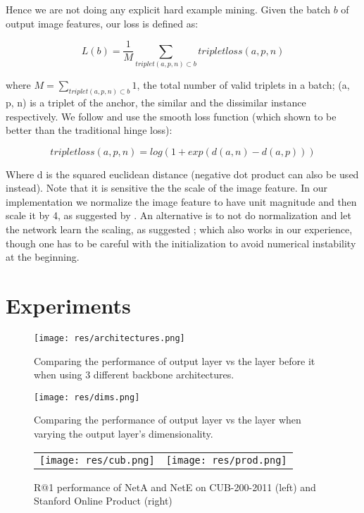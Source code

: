 \documentclass[10pt,twocolumn,letterpaper]{article}
\begin{document}
Hence we are not doing any explicit hard example mining.
Given the batch $b$ of output image features, our loss is defined as:

$$L(b) = \frac{1}{M} \sum_{triplet (a,p,n) \subset b}^{} tripletloss(a, p, n)$$

where $M = \sum_{triplet (a,p,n) \subset b}^{} 1$, the total number of valid triplets in a batch; (a, p, n) is a triplet of the anchor, the similar and the dissimilar instance respectively. We follow \cite{vo2016localizing, sohn2016improved, hermans2017defense} and use the smooth loss function (which shown to be better than the traditional hinge loss):

$$tripletloss(a, p, n) = log(1 + exp(d(a,n) - d(a,p)))$$

Where d is the squared euclidean distance (negative dot product can also be used instead). Note that it is sensitive the the scale of the image feature. In our implementation we normalize the image feature to have unit magnitude and then scale it by 4, as suggested by \cite{vo2016localizing}. An alternative is to not do normalization and let the network learn the scaling, as suggested \cite{hermans2017defense}; which also works in our experience, though one has to be careful with the initialization to avoid numerical instability at the beginning.


\section{Experiments}


\begin{figure}
  \texttt{[image: res/architectures.png]}
  \vspace{2pt}
  \caption{Comparing the performance of output layer vs the layer before it when using 3 different backbone architectures.}
  \label{fig:architectures}
\end{figure}


\begin{figure}
  \texttt{[image: res/dims.png]}
  \vspace{2pt}
  \caption{Comparing the performance of output layer vs the layer when varying the output layer's dimensionality.}
  \label{fig:dims}
\end{figure}



\begin{figure*}[h]
\begin{tabular}{ll}
\texttt{[image: res/cub.png]}
&
\texttt{[image: res/prod.png]}
\end{tabular}
\vspace{5pt}
\caption{R@1 performance of NetA and NetE on CUB-200-2011 (left) and Stanford Online Product (right)}
\label{fig:cub}
\end{figure*}
\end{document}
